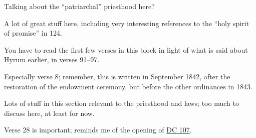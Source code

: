 \begin{compactdesc}
				\begin{compactitem}
					\item Talking about the ``patriarchal'' priesthood here?
				\end{compactitem}
			\item[{\hyperref[DC124-123]{DC 124:123--145}}] \phantom{.}
				\begin{compactitem}
					\item A lot of great stuff here, including very interesting references to the ``holy spirit of promise'' in 124.
					\item You have to read the first few verses in this block in light of what is said about Hyrum earlier, in verses 91--97.
				\end{compactitem}
			\item[{\hyperref[DC127-6]{DC 127:6--8}}] \phantom{.}
				\begin{compactitem}
					\item Especially verse 8; remember, this is written in September 1842, after the restoration of the endowment ceremony, but before the other ordinances in 1843.
				\end{compactitem}
			\item[{\hyperref[DC128-8]{DC 128:8--18}}]
			\item[{\hyperref[DC128-20]{DC 128:20--21}}]
			\item[{\hyperref[DC128-23]{DC 128:23}}]
			\item[{\hyperref[DC130-20]{DC 130:20--21}}]
			\item[{\hyperref[DC132]{DC 132}}] \phantom{.}
				\begin{compactitem}
					\item Lots of stuff in this section relevant to the priesthood and laws; too much to discuss here, at least for now.
					\item Verse 28 is important; reminds me of the opening of \hyperref[DC107]{DC 107}.
				\end{compactitem}
			\item[{\hyperref[DC138-51]{DC 138:51}}]
		\end{compactdesc}
		
	
		
